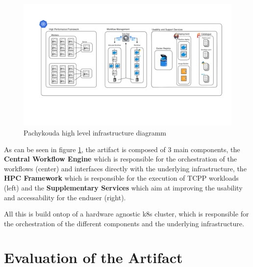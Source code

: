 \begin{figure}[htb]
    \centering
    \includegraphics[width=16cm]{graphics/pachykouda_three_aspects.png}
    \caption[Pachykouda high level diagram showing three main aspects]{Pachykouda high level infrastructure diagramm}
    \label{abb:pachykouda_three_aspects}
\end{figure}


As can be seen in figure \ref{abb:pachykouda_three_aspects}, the artifact is composed of 3 main components, 
the \textbf{Central Workflow Engine} which is responsible for the orchestration of the workflows (center) and interfaces directly with the underlying infrastructure,
the \textbf{\ac{HPC} Framework} which is responsible for the execution of \ac{TCPP} workloads (left)
and the \textbf{Supplementary Services} which aim at improving the usability and accessability for the enduser (right).

All this is build ontop of a hardware agnostic \ac{k8s} cluster, which is responsible for the orchestration of the different components and the underlying infrastructure.

\newpage






\section{Evaluation of the Artifact}

\newpage
